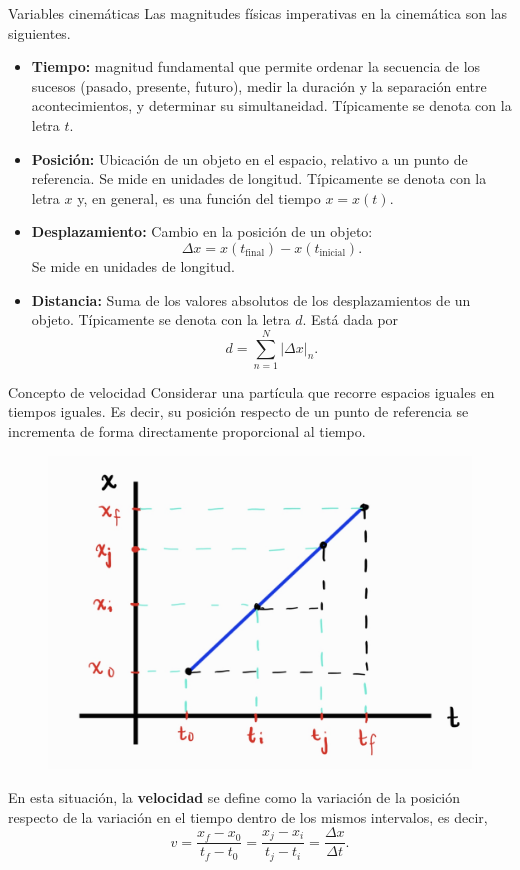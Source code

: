\begin{frame}{Variables cinemáticas}
Las magnitudes físicas imperativas en la cinemática son las siguientes.

    \begin{itemize}
        \item \textbf{Tiempo:} magnitud fundamental que permite ordenar la secuencia de los sucesos (pasado, presente, futuro), medir la duración y la separación entre acontecimientos, y determinar su simultaneidad. Típicamente se denota con la letra $t$.
    \end{itemize}
\end{frame}

\begin{frame}
    \begin{itemize}
        \item \textbf{Posición:} Ubicación de un objeto en el espacio, relativo a un punto de referencia. Se mide en unidades de longitud. Típicamente se denota con la letra $x$ y, en general, es una función del tiempo $x=x(t)$.
        \item \textbf{Desplazamiento:} Cambio en la posición de un objeto: $$\Delta x = x(t_\text{final})-x(t_\text{inicial}).$$ Se mide en unidades de longitud.
        \item \textbf{Distancia:} Suma de los valores absolutos de los desplazamientos de un objeto. Típicamente se denota con la letra $d$. Está dada por $$d = \sum_{n=1}^N\lvert\Delta x\lvert_n.$$
    \end{itemize}
\end{frame}

\begin{frame}{Concepto de velocidad}
    Considerar una partícula que recorre espacios iguales en tiempos iguales. Es decir, su posición respecto de un punto de referencia se incrementa de forma directamente proporcional al tiempo.

    \begin{figure}
        \centering
        \includegraphics[width=0.4\linewidth]{figures/XvsT1.jpg}
    \end{figure}

    En esta situación, la \textbf{velocidad} se define como la variación de la posición respecto de la variación en el tiempo dentro de los mismos intervalos, es decir, $$v=\frac{x_f-x_0}{t_f-t_0}=\frac{x_j-x_i}{t_j-t_i}=\frac{\Delta x}{\Delta t}.$$
    
\end{frame}

